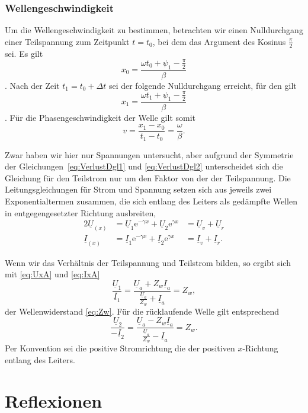 \documentclass[paper=a4, parskip=half-, ngerman, fontsize=11pt]{scrreprt}
\begin{document}
\subsubsection{Wellengeschwindigkeit}

Um die Wellengeschwindigkeit zu bestimmen, betrachten wir einen Nulldurchgang einer Teilspannung zum Zeitpunkt
$t=t_{0}$, bei dem das Argument des Kosinus $\frac{\pi}{2}$ sei. Es gilt
\[ x_{0} = \frac{\omega t_{0} + \psi_{1} -\frac{\pi}{2}}{\beta} \]. Nach der Zeit $t_{1} = t_{0} + \Delta t$ sei der
folgende Nulldurchgang erreicht, für den gilt
\[ x_{1} = \frac{\omega t_{1} + \psi_{1} -\frac{\pi}{2}}{\beta} \]. Für die Phasengeschwindigkeit der Welle gilt somit
\[ v = \frac{x_{1} - x_{0}}{t_{1} - t_{0}} = \frac{\omega}{\beta}. \]

Zwar haben wir hier nur Spannungen untersucht, aber aufgrund der Symmetrie der Gleichungen~\eqref{eq:VerlustDgl1} und
\eqref{eq:VerlustDgl2} unterscheidet sich die Gleichung für den Teilstrom nur um den Faktor von der der Teilspannung.
Die Leitungsgleichungen für Strom und Spannung setzen sich aus jeweils zwei Exponentialtermen zusammen, die sich
entlang des Leiters als gedämpfte Wellen in entgegengesetzter Richtung ausbreiten,
\begin{alignat}{2}
\underline{U}_(x) &= \underline{U}_{1} \mathrm{e}^{- \gamma x} + \underline{U}_{2} \mathrm{e}^{\gamma x}
&= \underline{U}_{v} + \underline{U}_{r} \\[1ex]
\underline{I}_(x) &= \underline{I}_{1} \mathrm{e}^{- \gamma x} + \underline{I}_{2} \mathrm{e}^{\gamma x}
&= \underline{I}_{v} + \underline{I}_{r}.
\end{alignat}

Wenn wir das Verhältnis der Teilspannung und Teilstrom bilden, so ergibt sich mit \eqref{eq:UxA} und \eqref{eq:IxA}
\[ \frac{\underline{U}_{1}}{\underline{I}_{1}} = \frac{\underline{U}_{a} + Z_{w}
\underline{I}_{a}}{\frac{\underline{U}_{a}}{Z_{w}} + \underline{I}_{a}} = Z_{w}, \]
der Wellenwiderstand \eqref{eq:Zw}. Für die rücklaufende Welle gilt entsprechend
\[ \frac{\underline{U}_{2}}{-\underline{I}_{2}} = \frac{\underline{U}_{a} - Z_{w}
\underline{I}_{a}}{\frac{\underline{U}_{a}}{Z_{w}} - \underline{I}_{a}} = Z_{w}. \]
Per Konvention sei die positive Stromrichtung die der positiven $x$-Richtung entlang des Leiters.


\section{Reflexionen}
\end{document}
